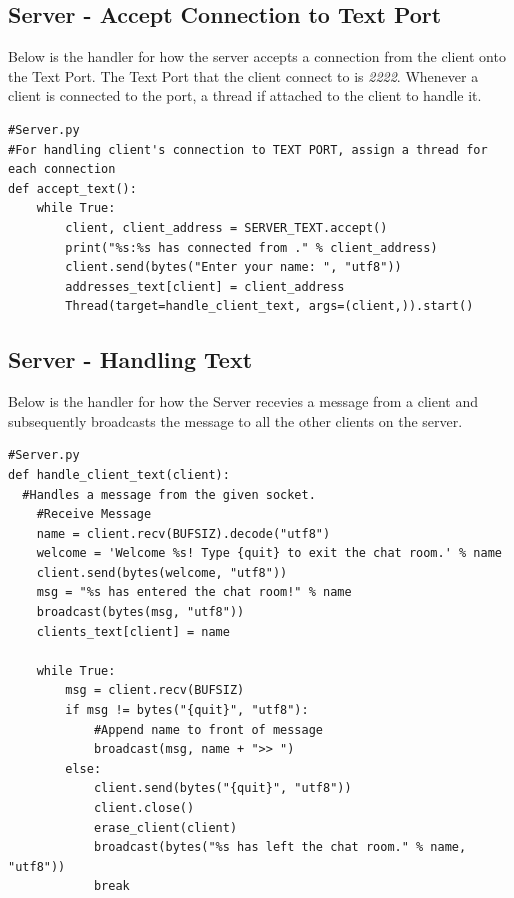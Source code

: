 \documentclass[a4paper,11pt]{article}
\begin{document}
\subsection{Server - Accept Connection to Text Port}
Below is the handler for how the server accepts a connection from the client onto the Text Port. The Text Port that the client connect to is \textit{2222}. Whenever a client is connected to the port, a thread if attached to the client to handle it.
\begin{mdframed}[backgroundcolor=light-gray, roundcorner=30pt,leftmargin=1, rightmargin=1, innerleftmargin=5, innertopmargin=-3,innerbottommargin=5, outerlinewidth=1, linecolor=light-gray]
\begin{lstlisting}
#Server.py
#For handling client's connection to TEXT PORT, assign a thread for each connection
def accept_text():
	while True:
		client, client_address = SERVER_TEXT.accept()
		print("%s:%s has connected from ." % client_address)
		client.send(bytes("Enter your name: ", "utf8"))
		addresses_text[client] = client_address
		Thread(target=handle_client_text, args=(client,)).start()

\end{lstlisting}
\end{mdframed}

\subsection{Server - Handling Text}
Below is the handler for how the Server recevies a message from a client and subsequently broadcasts the message to all the other clients on the server.
\begin{mdframed}[backgroundcolor=light-gray, roundcorner=30pt,leftmargin=1, rightmargin=1, innerleftmargin=5, innertopmargin=-3,innerbottommargin=5, outerlinewidth=1, linecolor=light-gray]
\begin{lstlisting}
#Server.py
def handle_client_text(client):
  #Handles a message from the given socket.
	#Receive Message
	name = client.recv(BUFSIZ).decode("utf8")
	welcome = 'Welcome %s! Type {quit} to exit the chat room.' % name
	client.send(bytes(welcome, "utf8"))
	msg = "%s has entered the chat room!" % name
	broadcast(bytes(msg, "utf8"))
	clients_text[client] = name

	while True:
		msg = client.recv(BUFSIZ)
		if msg != bytes("{quit}", "utf8"):
			#Append name to front of message
			broadcast(msg, name + ">> ")
		else:
			client.send(bytes("{quit}", "utf8"))
			client.close()
			erase_client(client)
			broadcast(bytes("%s has left the chat room." % name, "utf8"))
			break

\end{lstlisting}
\end{mdframed}
\end{document}
